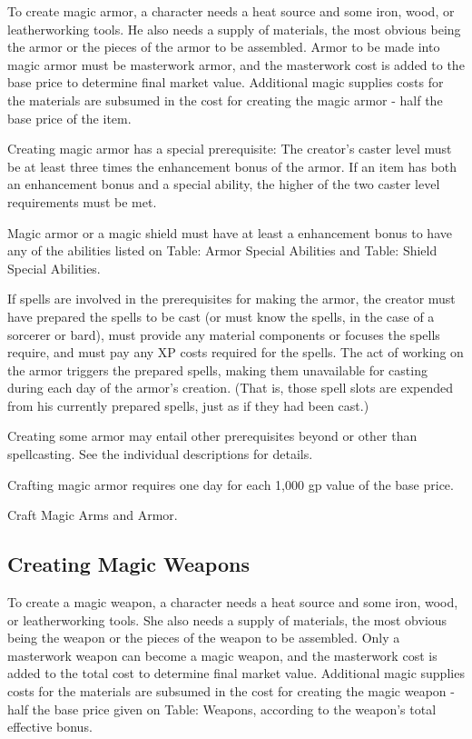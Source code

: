 To create magic armor, a character needs a heat source and some iron, wood, or leatherworking tools. He also needs a supply of materials, the most obvious being the armor or the pieces of the armor to be assembled. Armor to be made into magic armor must be masterwork armor, and the masterwork cost is added to the base price to determine final market value. Additional magic supplies costs for the materials are subsumed in the cost for creating the magic armor - half the base price of the item.

Creating magic armor has a special prerequisite: The creator's caster level must be at least three times the enhancement bonus of the armor. If an item has both an enhancement bonus and a special ability, the higher of the two caster level requirements must be met.

Magic armor or a magic shield must have at least a  enhancement bonus to have any of the abilities listed on Table: Armor Special Abilities and Table: Shield Special Abilities.

If spells are involved in the prerequisites for making the armor, the creator must have prepared the spells to be cast (or must know the spells, in the case of a sorcerer or bard), must provide any material components or focuses the spells require, and must pay any XP costs required for the spells. The act of working on the armor triggers the prepared spells, making them unavailable for casting during each day of the armor's creation. (That is, those spell slots are expended from his currently prepared spells, just as if they had been cast.)

Creating some armor may entail other prerequisites beyond or other than spellcasting. See the individual descriptions for details.

Crafting magic armor requires one day for each 1,000 gp value of the base price.

 Craft Magic Arms and Armor.

\subsection{Creating Magic Weapons}

To create a magic weapon, a character needs a heat source and some iron, wood, or leatherworking tools. She also needs a supply of materials, the most obvious being the weapon or the pieces of the weapon to be assembled. Only a masterwork weapon can become a magic weapon, and the masterwork cost is added to the total cost to determine final market value. Additional magic supplies costs for the materials are subsumed in the cost for creating the magic weapon - half the base price given on Table: Weapons, according to the weapon's total effective bonus.

